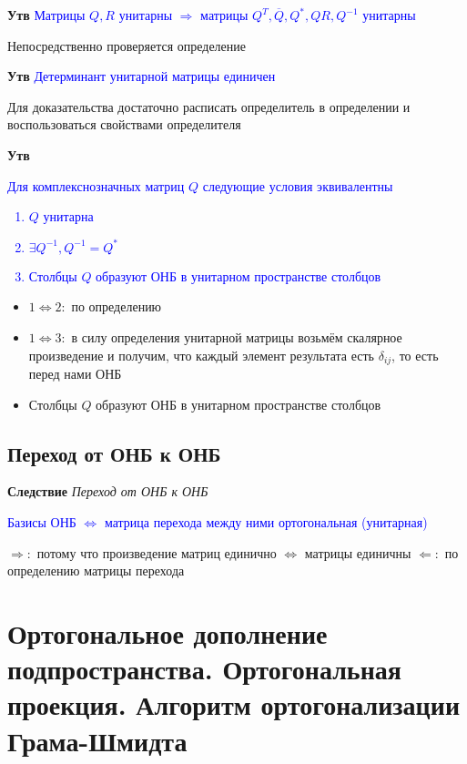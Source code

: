 \documentclass[a4paper, 14pt]{article}
\begin{document}
    \textbf{Утв} \textcolor{blue}{Матрицы $Q, R$ унитарны $\Rightarrow$ матрицы $Q^T, \overline{Q}, Q^*, QR, Q^{-1}$
        унитарны}
    
    Непосредственно проверяется определение
    
    \textbf{Утв} \textcolor{blue}{Детерминант унитарной матрицы единичен}
    
    Для доказательства достаточно расписать определитель в определении и воспользоваться свойствами определителя
    
    \textbf{Утв} \textcolor{blue}{Для комплекснозначных матриц $Q$ следующие условия эквивалентны
        \begin{enumerate}
            \item $Q$ унитарна
            \item $\exists Q^{-1},  Q^{-1} = Q^*$
            \item Столбцы $Q$ образуют ОНБ в унитарном пространстве столбцов
        \end{enumerate}               }
    
    \begin{itemize}
        \item $1 \Leftrightarrow 2:$ по определению
        \item $1 \Leftrightarrow 3:$ в силу определения унитарной матрицы возьмём скалярное произведение и получим,
        что каждый элемент результата есть $\delta_{ij}$, то есть перед нами ОНБ
        \item Столбцы $Q$ образуют ОНБ в унитарном пространстве столбцов
    \end{itemize}
    
    \subsection{Переход от ОНБ к ОНБ}
    
    \textbf{Следствие} \textit{Переход от ОНБ к ОНБ}
    
    \textcolor{blue}{Базисы ОНБ $\Leftrightarrow$ матрица перехода между ними ортогональная (унитарная)}
    
    $\Rightarrow:$ потому что произведение матриц единично $\Leftrightarrow$ матрицы единичны
    $\Leftarrow:$ по определению матрицы перехода
    
    \section{Ортогональное дополнение подпространства.
    Ортогональная проекция.
    Алгоритм ортогонализации Грама-Шмидта}
    
\end{document}
